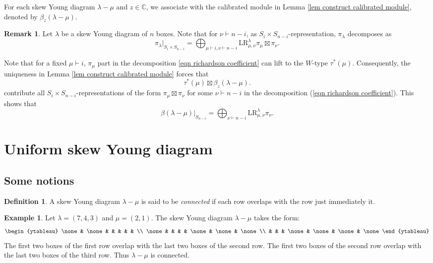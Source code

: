 \documentclass[11pt]{amsart}
\numberwithin{equation}{section}
\theoremstyle{definition}
\newtheorem{remark}[thm]{Remark}
\newtheorem{definition}[thm]{Definition}
\newtheorem{example}[thm]{Example}
\begin{document}
    For each skew Young diagram $\lambda-\mu$ and $z \in \mathbb C$, we associate with the calibrated module in Lemma \ref{lem construct calibrated module}, denoted by $\beta_z(\lambda-\mu)$.



\begin{remark}
Let \( \lambda\) be a skew Young diagram of \(n\) boxes. Note that for $\nu \vdash n-i$, as \(S_{i}\times S_{n-i}\)-representation, \(\pi_{\lambda} \) decomposes as
\begin{equation} \label{eqn richardson coefficient}  \pi_{\lambda}|_{S_i \times S_{n-i}} = \bigoplus_{\mu \vdash i, \nu \vdash n-i} \mathrm{LR}^{\lambda}_{\mu, \nu} \pi_{\mu}\boxtimes\pi_{\nu}.
\end{equation}

Note that for a fixed \(\mu \vdash i\),  \( \pi_{\mu}\) part in the decomposition \ref{eqn richardson coefficient} can lift to the \(W\)-type \(\tau^*(\mu)\). Consequently, the uniqueness in Lemma \ref{lem construct calibrated module} forces that 
\[  \tau^*(\mu)\boxtimes \beta_z(\lambda-\mu).
\]
contribute all \(S_i \times S_{n-i}\)-representations of the form \(\pi_{\mu} \boxtimes \pi_{\nu}\) for some \(\nu \vdash n-i\) in the decomposition (\ref{eqn richardson coefficient}). This shows that 
 \[ \beta(\lambda-\mu)|_{S_{n-i}} =\bigoplus_{\nu \vdash n-i} \mathrm{LR}^{\lambda}_{\mu, \nu}\pi_{\nu} .\]
\end{remark}




\section{Uniform skew Young diagram}\label{sec uniform skew diagram}

\subsection{Some notions}

\begin{definition}
A skew Young diagram $\lambda-\mu$ is said to be {\it connected} if each row overlaps with the row just immediately it. 
\end{definition}

\begin{example} \label{ex skew young diagram}
Let $\lambda=(7, 4, 3)$ and $\mu=(2,1)$. The skew Young diagram $\lambda-\mu$ takes the form:
\[
\begin{ytableau}
      \none & \none    &        &    &   &     & \\
  \none     &          &        &     & \none  & \none   & \none    \\
           &           &      & \none   & \none  & \none  & \none
\end{ytableau}
\]
The first two boxes of the first row overlap with the last two boxes of the second row. The first two boxes of the second row overlap with the last two boxes of the third row. Thus $\lambda-\mu$ is connected.
\end{example}
\end{document}
